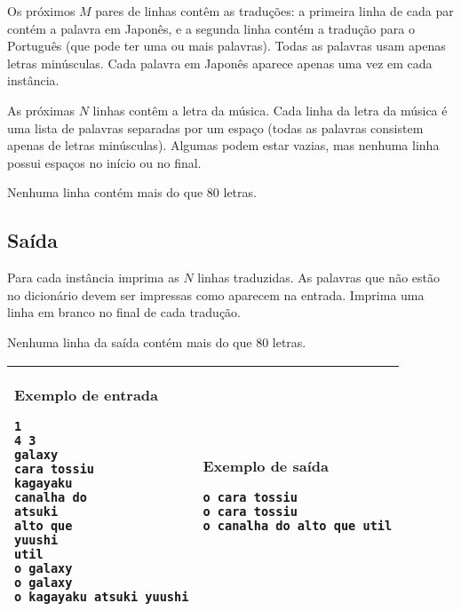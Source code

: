Os próximos $M$ pares de linhas contêm as traduções: a primeira linha de cada par
contém a palavra em Japonês, e a segunda linha contém a tradução para o
Português (que pode ter uma ou mais palavras). Todas as palavras usam apenas
letras minúsculas. Cada palavra em Japonês aparece apenas uma vez em cada
instância.

As próximas $N$ linhas contêm a letra da música. Cada linha da letra da música é
uma lista de palavras separadas por um espaço (todas as palavras consistem
apenas de letras minúsculas). Algumas podem estar vazias, mas nenhuma
linha possui espaços no início ou no final.

Nenhuma linha contém mais do que 80 letras.


\subsection*{Saída}

Para cada instância imprima as $N$ linhas traduzidas. As palavras que não estão no
dicionário devem ser impressas como aparecem na entrada. Imprima uma linha em
branco no final de cada tradução.

Nenhuma linha da saída contém mais do que 80 letras.

\begin{table}[!h]
\centering
\begin{tabular}{|l|l|}
\hline
\begin{minipage}[t]{3in}
\textbf{Exemplo de entrada}
\begin{verbatim}
1
4 3
galaxy
cara tossiu
kagayaku
canalha do
atsuki
alto que
yuushi
util
o galaxy
o galaxy
o kagayaku atsuki yuushi
\end{verbatim}
\vspace{1mm}
\end{minipage}
&

\begin{minipage}[t]{3in}
\textbf{Exemplo de saída}
\begin{verbatim}
o cara tossiu
o cara tossiu
o canalha do alto que util
\end{verbatim}
\vspace{1mm}
\end{minipage} \\
\hline
\end{tabular}
\end{table}

\newpage
